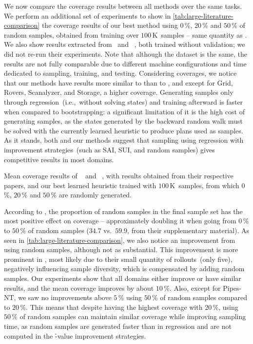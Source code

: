 We now compare the coverage results between all methods over the same tasks. We perform an additional set of experiments to show in \cref{tab:large-literature-comparison} the coverage results of our best method using $0\,\%$, $20\,\%$ and $50\,\%$ of random samples, obtained from training over $100$\,K~samples -- same quantity as \citet{otoole2022sampling}. We also show results extracted from \citet{ferber2022neural}~\hboot and \citet{otoole2022sampling}~\hnrsl, both trained without validation; we did not re-run their experiments. Note that although the dataset is the same, the results are not fully comparable due to different machine configurations and time dedicated to sampling, training, and testing. Considering coverages, we notice that our methods have results more similar to \hnrsl than to \hboot, and except for Grid, Rovers, Scanalyzer, and Storage, a higher coverage. Generating samples only through regression~(i.e.,~without solving states) and training afterward is faster when compared to bootstrapping: a significant limitation of it is the high cost of generating samples, as the states generated by the backward random walk must be solved with the currently learned heuristic to produce plans used as samples. As it stands, both \hnrsl and our methods suggest that sampling using regression with improvement strategies~(such as SAI, SUI, and random samples) gives competitive results in most domains.

\begin{table}[ht]
    \caption[Mean coverage results of our approach compared to those in the literature.]{Mean coverage results of \hboot~\cite{ferber2022neural} and \hnrsl~\cite{otoole2022sampling}, with results obtained from their respective papers, and our best learned heuristic trained with $100$\,K~samples, from which $0$\,\%, $20$\,\% and $50$\,\% are randomly generated.}
    \label{tab:large-literature-comparison}
    \addmargin
    \centering
    
\end{table}

According to \citet{otoole2022sampling}, the proportion of random samples in the final sample set has the most positive effect on coverage -- approximately doubling it when going from $0\,\%$ to $50\,\%$ of random samples ($34.7$ vs.~$59.9$, from their supplementary material). As seen in \cref{tab:large-literature-comparison}, we also notice an improvement from using random samples, although not as substantial. This improvement is more prominent in \citet{otoole2022sampling}, most likely due to their small quantity of rollouts~(only five), negatively influencing sample diversity, which is compensated by adding random samples. Our experiments show that all domains either improve or have similar results, and the mean coverage improves by about $10\,\%$. Also, except for Pipes-NT, we saw no improvements above $5\,\%$ using $50\,\%$ of random samples compared to $20\,\%$. This means that despite having the highest coverage with $20\,\%$, using $50\,\%$ of random samples can maintain similar coverage while improving sampling time, as random samples are generated faster than in regression and are not computed in the \h-value improvement strategies.

